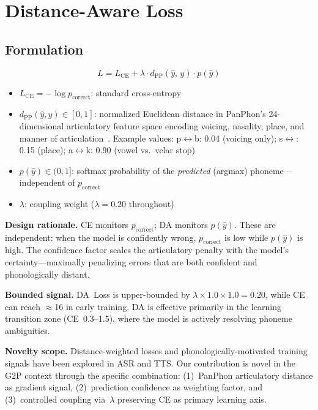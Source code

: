 \documentclass[conference]{IEEEtran}
\newcommand{\dpp}{d_{\mathrm{PP}}}        %
\newcommand{\LCE}{L_{\mathrm{CE}}}        %
\newcommand{\lam}{\lambda}                %
\begin{document}
\section{Distance-Aware Loss}
\label{sec:daloss}

\subsection{Formulation}

\begin{equation}
  \boxed{L = \LCE + \lam \cdot \dpp(\hat{y},\, y) \cdot p(\hat{y})}
  \label{eq:daloss}
\end{equation}

\begin{itemize}
  \item $\LCE = -\log p_\mathrm{correct}$: standard cross-entropy
  \item $\dpp(\hat{y}, y) \in [0,1]$: normalized Euclidean distance
        in PanPhon's 24-dimensional articulatory feature space
        encoding voicing, nasality, place, and manner of
        articulation~\cite{mortensen2016panphon}.
        Example values: p$\leftrightarrow$b: 0.04 (voicing only);
        s$\leftrightarrow$: 0.15 (place);
        a$\leftrightarrow$k: 0.90 (vowel vs.\ velar stop)
  \item $p(\hat{y}) \in (0,1]$: softmax probability of the
        \emph{predicted} (argmax) phoneme---independent of
        $p_\mathrm{correct}$
  \item $\lam$: coupling weight ($\lam\!=\!0.20$ throughout)
\end{itemize}

\textbf{Design rationale.}
CE monitors $p_\mathrm{correct}$; DA monitors $p(\hat{y})$.
These are independent: when the model is confidently wrong,
$p_\mathrm{correct}$ is low while $p(\hat{y})$ is high.
The confidence factor scales the articulatory penalty with the
model's certainty---maximally penalizing errors that are both
confident and phonologically distant.

\textbf{Bounded signal.}
DA~Loss is upper-bounded by $\lam\!\times\!1.0\!\times\!1.0=0.20$,
while CE can reach $\approx$16 in early training.
DA is effective primarily in the learning transition zone
(CE~0.3--1.5), where the model is actively resolving phoneme
ambiguities.

\textbf{Novelty scope.}
Distance-weighted losses and phonologically-motivated training
signals have been explored in ASR and TTS.
Our contribution is novel in the G2P context through the specific
combination: (1)~PanPhon articulatory distance as gradient signal,
(2)~prediction confidence as weighting factor, and (3)~controlled
coupling via~$\lam$ preserving CE as primary learning axis.
\end{document}
